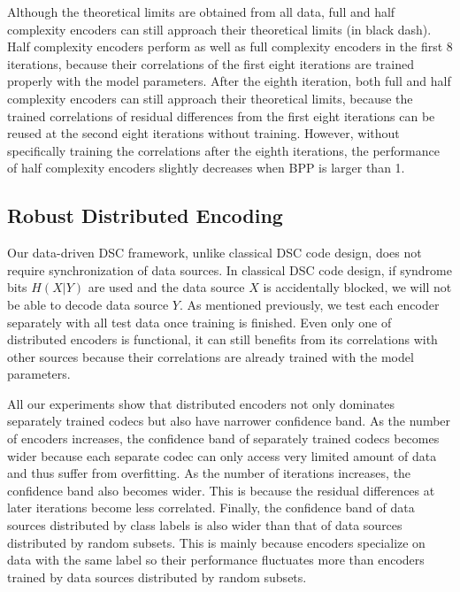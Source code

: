 \documentclass[10pt,twocolumn,letterpaper]{article}
\begin{document}
Although the theoretical limits are obtained from all data, full and half complexity encoders %
can still approach their theoretical limits (in black dash). Half complexity encoders perform as well as full complexity encoders in the first 8 iterations, because their correlations of the first eight iterations are trained properly with the model parameters. After the eighth iteration, both full and half complexity encoders can still approach their theoretical limits, because the trained correlations of residual differences from the first eight iterations can be reused at the second eight iterations without training. However, without specifically training the correlations after the eighth iterations, the performance of half complexity encoders slightly decreases when BPP is larger than 1. %


\subsection{Robust Distributed Encoding}
Our data-driven DSC framework, unlike classical DSC code design, does not require synchronization of data sources. In classical DSC code design, if syndrome bits $H(X|Y)$ are used and the data source $X$ is accidentally blocked, we will not be able to decode data source $Y$. As mentioned previously, we test each encoder separately with all test data once training is finished. Even only one of distributed encoders is functional, it can still benefits from its correlations with other sources because their correlations are already trained with the model parameters. 

All our experiments show that distributed encoders not only dominates separately trained codecs but also have narrower confidence band. As the number of encoders increases, the confidence band of separately trained codecs becomes wider because each separate codec can only access very limited amount of data and thus suffer from overfitting. As the number of iterations increases, the confidence band also becomes wider. This is because the residual differences at later iterations become less correlated. Finally, the confidence band of data sources distributed by class labels is also wider than that of data sources distributed by random subsets. This is mainly because encoders specialize on data with the same label so their performance fluctuates more than encoders trained by data sources distributed by random subsets. %
\end{document}
